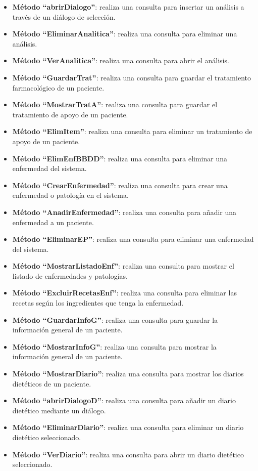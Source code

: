 \begin{itemize}
\begin{itemize}
\item \textbf{Método ``abrirDialogo''}: realiza una consulta para insertar un análisis a través de un diálogo de selección.
\item \textbf{Método ``EliminarAnalitica''}: realiza una consulta para eliminar una análisis.
\item \textbf{Método ``VerAnalitica''}: realiza una consulta para abrir el análisis.
\item \textbf{Método ``GuardarTrat''}: realiza una consulta para guardar el tratamiento farmacológico de un paciente.
\item \textbf{Método ``MostrarTratA''}: realiza una consulta para guardar el tratamiento de apoyo de un paciente.
\item \textbf{Método ``ElimItem''}: realiza una consulta para eliminar un tratamiento de apoyo de un paciente.
\item \textbf{Método ``ElimEnfBBDD''}: realiza una consulta para eliminar una enfermedad del sistema.
\item \textbf{Método ``CrearEnfermedad''}: realiza una consulta para crear una enfermedad o patología en el sistema.
\item \textbf{Método ``AnadirEnfermedad''}: realiza una consulta para añadir una enfermedad a un paciente.
\item \textbf{Método ``EliminarEP''}: realiza una consulta para eliminar una enfermedad del sistema.
\item \textbf{Método ``MostrarListadoEnf''}: realiza una consulta para mostrar el listado de enfermedades y patologías.
\item \textbf{Método ``ExcluirRecetasEnf''}: realiza una consulta para eliminar las recetas según los ingredientes que tenga la enfermedad.
\item \textbf{Método ``GuardarInfoG''}: realiza una consulta para guardar la información general de un paciente.
\item \textbf{Método ``MostrarInfoG''}: realiza una consulta para mostrar la información general de un paciente.
\item \textbf{Método ``MostrarDiario''}: realiza una consulta para mostrar los diarios dietéticos de un paciente.
\item \textbf{Método ``abrirDialogoD''}: realiza una consulta para añadir un diario dietético mediante un diálogo.
\item \textbf{Método ``EliminarDiario''}: realiza una consulta para eliminar un diario dietético seleccionado.
\item \textbf{Método ``VerDiario''}: realiza una consulta para abrir un diario dietético seleccionado.

\end{itemize}
\end{itemize}
